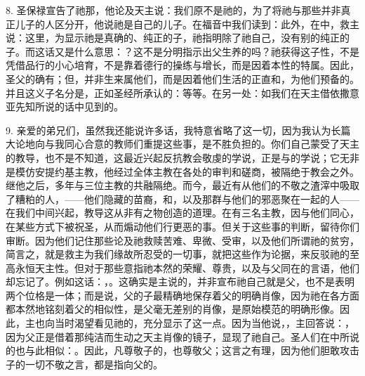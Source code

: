 8. 圣保禄宣告了祂那，他论及天主说：我们原不是祂的，为了将祂与那些并非真正儿子的人区分开，他说祂是自己的儿子。在福音中我们读到：此外，在中，救主说：这里，为显示祂是真确的、纯正的子，祂指明除了祂自己，没有别的纯正的子。而这话又是什么意思：？这不是分明指示出父生养的吗？祂获得这子性，不是凭借品行的小心培育，不是靠着德行的操练与增长，而是因着本性的特属。因此，圣父的确有；但，并非生来属他们，而是因着他们生活的正直和，为他们预备的。并且这义子名分是，正如圣经所承认的：等等。在另一处：如我们在天主借依撒意亚先知所说的话中见到的。\par

9. 亲爱的弟兄们，虽然我还能说许多话，我特意省略了这一切，因为我认为长篇大论地向与我同心合意的教师们重提这些事，是不胜负担的。你们自己蒙受了天主的教导，也不是不知道，这最近兴起反抗教会敬虔的学说，正是与的学说；它无非是模仿安提约基主教，他经过全体主教在各处的审判和磋商，被隔绝于教会之外。继他之后，多年与三位主教的共融隔绝。而今，最近有从他们的不敬之渣滓中吸取了糟粕的人，——他们隐藏的苗裔，和，以及那群与他们的邪恶聚在一起的人——在我们中间兴起，教导这从非有之物创造的道理。在有三名主教，因与他们同心，在某些方式下被祝圣，从而煽动他们行更恶的事。但关于这些事的判断，留待你们审断。因为他们记住那些论及祂救赎苦难、卑微、受审，以及他们所谓祂的贫穷，简言之，就是救主为我们缘故所忍受的一切事，就把这些作为论据，来反驳祂的至高永恒天主性。但对于那些意指祂本然的荣耀、尊贵，以及与父同在的言语，他们却忘记了。例如这话：，。这确实是主说的，并非宣布祂自己就是父，也不是表明两个位格是一体；而是说，父的子最精确地保存着父的明确肖像，因为祂在各方面都本然地铭刻着父的相似性，是父毫无差别的肖像，是原始模范的明确形像。因此，主也向当时渴望看见祂的，充分显示了这一点。因为当他说，，主回答说：，因为父正是借着那纯洁而生动之天主肖像的镜子，显现了祂自己。圣人们在中所说的也与此相似：。因此，凡尊敬子的，也尊敬父；这言之有理，因为他们胆敢攻击子的一切不敬之言，都是指向父的。\par

